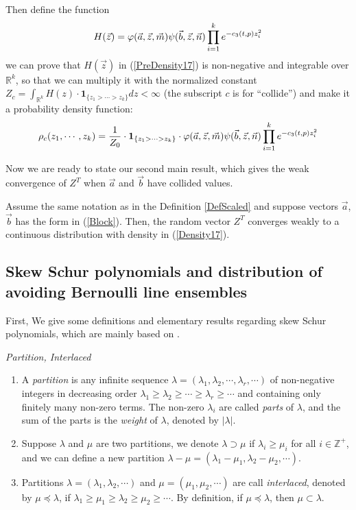 Then define the function 
\begin{align}{\label{PreDensity17}}
	H(\vec{z})=\varphi(\vec{a},\vec{z},\vec{m})\psi(\vec{b},\vec{z},\vec{n})\prod_{i=1}^{k}e^{-c_{3}(t,p)z_{i}^{2}}
\end{align}
we can prove that $H(\vec{z})$ in (\ref{PreDensity17}) is non-negative and integrable over $\mathbb{R}^{k}$, so that we can multiply it with the normalized constant $Z_{c}=\int_{\mathbb{R}^{k}}H(z)\cdot\mathbf{1}_{\{z_1>\cdots>z_{k}\}}dz<\infty$ (the subscript $c$ is for ``collide'') and make it a probability density function:
\begin{align}{\label{Density17}}
\rho_{c}(z_{1},\cdots,z_{k})=\frac{1}{Z_{0}}\cdot\mathbf{1}_{\{z_{1}>\cdots> z_{k}\}}\cdot \varphi(\vec{a},\vec{z},\vec{m})\psi(\vec{b},\vec{z},\vec{n})\prod_{i=1}^{k}e^{-c_{3}(t,p)z_{i}^{2}}	
\end{align}

Now we are ready to state our second main result, which gives the weak convergence of $Z^{T}$ when $\vec{a}$ and $\vec{b}$ have collided values.
\begin{proposition}{\label{WeakConvCollide}}
Assume the same notation as in the Definition \ref{DefScaled} and suppose vectors $\vec{a}$, $\vec{b}$ has the form in (\ref{Block}). Then, the random vector $Z^{T}$ converges weakly to a continuous distribution with density in (\ref{Density17}).
\end{proposition}

\subsection{Skew Schur polynomials and distribution of avoiding Bernoulli line ensembles}{\label{SkewSchurPoly}}
First, We give some definitions and elementary results regarding skew Schur polynomials, which are mainly based on \cite[Chapter 1]{Mac}.
\begin{definition}{\label{DefPar}} \emph{Partition, Interlaced}
\begin{enumerate}
	\item A \emph{partition} is any infinite sequence $\lambda=(\lambda_{1}, \lambda_{2}, \cdots, \lambda_{r}, \cdots)$ of non-negative integers in decreasing order $\lambda_{1}\geq \lambda_{2}\geq \cdots\geq \lambda_{r}\geq \cdots$ and containing only finitely many non-zero terms. The non-zero $\lambda_{i}$ are called \emph{parts} of $\lambda$, and the sum of the parts is the \emph{weight} of $\lambda$, denoted by $|\lambda|$.
	\item Suppose $\lambda$ and $\mu$ are two partitions, we denote $\lambda\supset\mu$ if $\lambda_{i}\geq \mu_{i}$ for all $i\in \mathbb{Z}^{+}$, and we can define a new partition $\lambda-\mu=(\lambda_{1}-\mu_{1},\lambda_{2}-\mu_{2},\cdots)$.
	\item Partitions $\lambda=(\lambda_{1}, \lambda_{2},\cdots)$ and $\mu=(\mu_{1}, \mu_{2},\cdots)$ are call \emph{interlaced}, denoted by $\mu\preceq \lambda$, if $\lambda_1\geq \mu_1\geq \lambda_2\geq \mu_2\geq\cdots$. By definition, if $\mu\preceq\lambda$, then $\mu\subset\lambda$.
\end{enumerate}
\end{definition}

